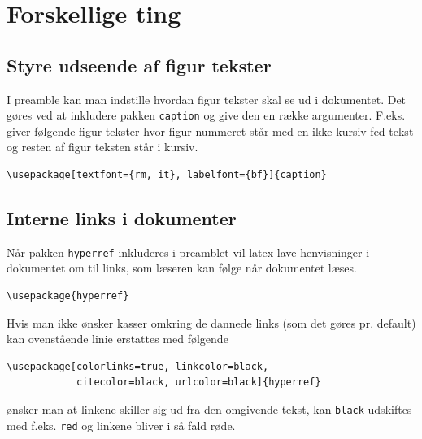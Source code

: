 \documentclass[11pt,a4paper,fleqn]{article}
\numberwithin{equation}{section}
\begin{document}
\newpage
\section{Forskellige ting}

\subsection{Styre udseende af figur tekster}

I preamble kan man indstille hvordan figur tekster skal se ud i
dokumentet.
%
Det gøres ved at inkludere pakken \verb!caption! og give den en
række argumenter.
F.eks. giver følgende figur tekster hvor figur nummeret står med en
ikke kursiv fed tekst og resten af figur teksten står i
kursiv.
%
\begin{lstlisting}
\usepackage[textfont={rm, it}, labelfont={bf}]{caption}
\end{lstlisting}


\subsection{Interne links i dokumenter}

Når pakken \verb!hyperref! inkluderes i preamblet vil latex lave
henvisninger i dokumentet om til links, som læseren kan følge når
%
dokumentet læses.
%
\begin{lstlisting}
\usepackage{hyperref}
\end{lstlisting}
%
Hvis man ikke ønsker kasser omkring de dannede links (som det gøres
pr. default) kan ovenstående linie erstattes med følgende
%
\begin{lstlisting}
\usepackage[colorlinks=true, linkcolor=black, 
            citecolor=black, urlcolor=black]{hyperref}
\end{lstlisting}
%
ønsker man at linkene skiller sig ud fra den omgivende tekst, kan
\verb!black! udskiftes med f.eks. \verb!red! og linkene bliver i så
fald røde.
\end{document}
